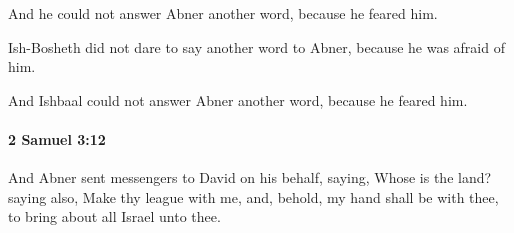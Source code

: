 			\begin{versebox}
					\item[BHS] 
					\item[ASV] And he could not answer Abner another word, because he feared him.
					\item[NIV] Ish-Bosheth did not dare to say another word to Abner, because he was afraid of him.
					\item[NRSV] And Ishbaal could not answer Abner another word, because he feared him.
			\end{versebox}

		\paragraph{2 Samuel 3:12} %
			\label{2SAMUEL-3-12}

			And Abner sent messengers to David on his behalf, saying, Whose is the land? saying also, Make thy league with me, and, behold, my hand shall be with thee, to bring about all Israel unto thee.

